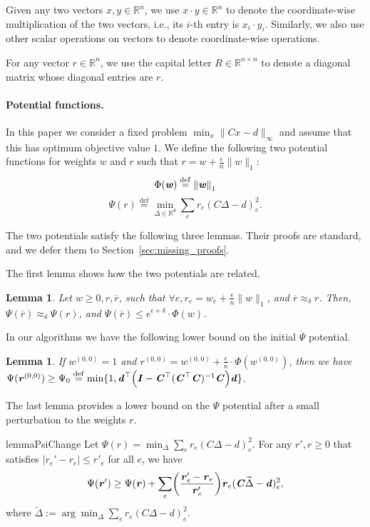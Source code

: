 \documentclass[11pt]{article}
\newcommand{\defeq}{\stackrel{\textup{def}}{=}}
\newtheorem{lemma}[theorem]{Lemma}
\renewcommand{\norm}[1]{\ensuremath{\left\lVert #1 \right\rVert}}
\newcommand\rea{\mathbb{R}}
\let\originalleft\left
\let\originalright\right
\renewcommand{\left}{\mathopen{}\mathclose\bgroup\originalleft}
\renewcommand{\right}{\aftergroup\egroup\originalright}
\def\defeq{\stackrel{\mathrm{def}}{=}}
\newcommand\dd{\boldsymbol{\mathit{d}}}
\newcommand\rr{\boldsymbol{\mathit{r}}}
\newcommand\ww{\boldsymbol{\mathit{w}}}
\newcommand\yy{\boldsymbol{\mathit{y}}}
\newcommand\xx{\boldsymbol{\mathit{x}}}
\newcommand\rrbar{\overline{\boldsymbol{\mathit{r}}}}
\newcommand\CC{\boldsymbol{\mathit{C}}}
\newcommand\II{\boldsymbol{\mathit{I}}}
\newcommand\RR{\boldsymbol{\mathit{R}}}
\newcommand\R{\mathbb{R}}
\begin{document}
Given any two vectors $\xx, \yy \in \mathbb{R}^n$, we use $\xx \cdot \yy \in \mathbb{R}^n$ to denote the coordinate-wise multiplication of the two vectors, i.e., its $i$-th entry is $\xx_i \cdot \yy_i$. Similarly, we also use other scalar operations on vectors to denote coordinate-wise operations.

For any vector $\rr \in \R^n$, we use the capital letter $\RR \in \R^{n \times n}$ to denote a diagonal matrix whose diagonal entries are $\rr$.

\paragraph{Potential functions.} In this paper we consider a fixed problem $\min_x \|\CC \xx - \dd\|_{\infty}$ and assume that this has optimum objective value $1$. We define the following two potential functions for weights $\ww$ and $\rr$ such that $\rr = \ww + \frac{\epsilon}{n}\|\ww\|_1$:
\begin{equation}\label{eq:defPhi}
    \Phi(\ww) \defeq \norm{\ww}_1
\end{equation}
\begin{equation}\label{eq:defPsi}
    \Psi(\rr)\defeq \min_{\Delta\in \rea^d }\sum_e \rr_e (\CC\Delta-\dd)^2_e.
\end{equation}

The two potentials satisfy the following three lemmas. Their proofs are standard, and we defer them to Section~\ref{sec:missing_proofs}.

The first lemma shows how the two potentials are related.
\begin{lemma}\label{lem:PsiPhi}
    Let $\ww \geq 0,\rr, \rrbar$, such that $\forall e, \rr_e = \ww_e + \frac{\epsilon}{n}\|\ww\|_1$, and $\rrbar\approx_{\delta}\rr$. Then, $\Psi(\rrbar) \approx_{\delta} \Psi(\rr)$, and $\Psi(\rrbar) \leq e^{\epsilon + \delta} \cdot \Phi(\ww)$.
\end{lemma}




In our algorithms we have the following lower bound on the initial $\Psi$ potential.
\begin{lemma}\label{lem:lower_bound_Psi_0}
If $\ww^{(0,0)} = 1$ and $\rr^{(0,0)} = \ww^{(0,0)} + \frac{\epsilon}{n} \cdot \Phi(\ww^{(0,0)})$, then we have
$\Psi(\rr^{(0,0)})\geq \Psi_0 \defeq \min\{1, \dd^{\top}\left(\II - \CC^{\top}(\CC^{\top}\CC)^{-1}\CC\right)\dd\}$. 
\end{lemma}


The last lemma provides a lower bound on the $\Psi$ potential after a small perturbation to the weights $\rr$.
\begin{restatable}{lemma}{PsiChange}\label{lem:PsiChange}
    Let $\Psi(\rr) =\min_{\Delta}\sum_e \rr_e (\CC\Delta-\dd)_e^2 $. For any $\rr',\rr\geq 0$ that satisfies $|\rr_e'-\rr_e| \leq \rr'_e$ for all $e$, we have
    \[
    \Psi(\rr') \geq \Psi(\rr)+ \sum_e \left(\frac{\rr'_e-\rr_e}{\rr'_e}\right)\rr_e (\CC\widetilde{\Delta}-\dd)_e^2,
    \]
    where $\widetilde{\Delta} := \arg\min_{\Delta}\sum_e \rr_e (\CC\Delta-\dd)_e^2$.
\end{restatable}
\end{document}
